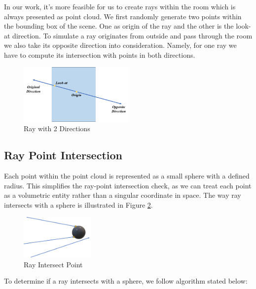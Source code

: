 \documentclass[11pt, a4paper,oneside,chapterprefix=false]{scrbook}
\begin{document}
\vspace{10pt}

In our work, it's more feasible for us to create rays within the room which is always presented as point cloud. We first randomly generate two points within the bounding box of the scene. One as origin of the ray and the other is the look-at direction. To simulate a ray originates from outside and pass through the room we also take its opposite direction into consideration. Namely, for one ray we have to compute its intersection with points in both directions. 

\begin{figure}[H]
    \centering
    \includegraphics*[width=0.5\textwidth]{figures/ray with two directions.png}
    \caption{Ray with 2 Directions}
    \label{fig:ray with 2 directions}
\end{figure}

\subsection{Ray Point Intersection} \label{ray point intersection}

Each point within the point cloud is represented as a small sphere with a defined radius. This simplifies the ray-point intersection check, as we can treat each point as a volumetric entity rather than a singular coordinate in space. The way ray intersects with a sphere is illustrated in Figure \ref{fig:ray intersect point}. 

\begin{figure}[H]
    \centering
    \includegraphics*[width=0.32\textwidth]{figures/ray intersect point.png}
    \caption{Ray Intersect Point}
    \label{fig:ray intersect point}
\end{figure}

To determine if a ray intersects with a sphere, we follow algorithm stated below:
\end{document}
